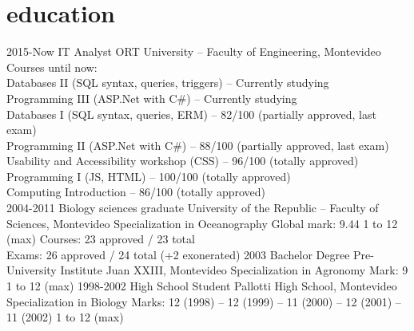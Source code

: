 \documentclass[]{friggeri-cv} %
\begin{document}
\section{education}

\begin{entrylist}

 \entry
 {2015-Now}
 {IT Analyst}
 {ORT University -- Faculty of Engineering, Montevideo}
 {Courses until now:\\
 	Databases II (SQL syntax, queries, triggers) -- Currently studying\\
 	Programming III (ASP.Net with C\#) -- Currently studying\\ 	 
 	Databases I (SQL syntax, queries, ERM) -- 82/100 (partially approved, last exam)\\
 	Programming II (ASP.Net with C\#) -- 88/100 (partially approved, last exam)\\
 	Usability and Accessibility workshop (CSS) -- 96/100 (totally approved)\\
 	Programming I (JS, HTML) -- 100/100 (totally approved)\\
 	Computing Introduction -- 86/100 (totally approved)\\
 	}	 
 \entry
 {2004-2011}
 {Biology sciences graduate}
 {University of the Republic -- Faculty of Sciences, Montevideo}
 {Specialization in Oceanography}
 \entry
 {}
 {\normalfont Global mark: 9.44}
 {1 to 12 (max)}  
 {Courses: {23 approved} / {23 total}\\
  Exams: {26 approved} / {24 total} (+2 exonerated)} 
 \entry
 {2003}
 {Bachelor Degree}
 {Pre-University Institute Juan XXIII, Montevideo}
 {Specialization in Agronomy}
 \entry
 {}
 {\normalfont Mark: 9}
 {1 to 12 (max)}
 {} 
 \entry
 {1998-2002}
 {High School Student}
 {Pallotti High School, Montevideo}
 {Specialization in Biology}
 \entry
 {}
 {\normalfont Marks: 12 (1998) -- 12 (1999) -- 11 (2000) -- 12 (2001) -- 11 (2002)}
 {1 to 12 (max)}
 {}
\end{entrylist}

\end{document}
